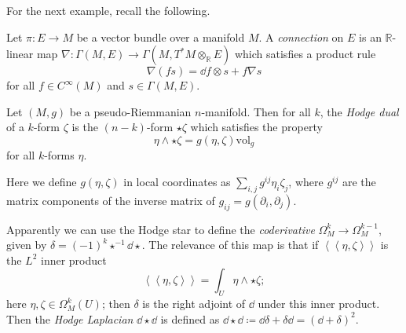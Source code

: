 For the next example, recall the following.

\begin{definition}\label{dfn:4.3.6}
	Let $\pi : E \to M$ be a vector bundle over a manifold $M$. A \emph{connection} on $E$ is an $\mathbb{R} $-linear map $\nabla : \Gamma (M,E) \to \Gamma (M,T^*M\otimes_\mathbb{R} E)$ which satisfies a product rule
	\[
		\nabla (fs) = \dd f\otimes s + f\nabla s
	\]
	for all $f\in C^\infty (M)$ and $s\in\Gamma (M,E)$.
\end{definition}

\begin{definition}\label{dfn:4.3.7}
	Let $(M,g)$ be a pseudo-Riemmanian $n$-manifold. Then for all $k$, the \emph{Hodge dual} of a $k$-form $\zeta $ is the $(n-k)$-form $\star \zeta $ which satisfies the property
	\[
		\eta \wedge \star \zeta =g(\eta ,\zeta )\mathrm{vol} _g
	\]
	for all $k$-forms $\eta$.
\end{definition}
Here we define $g(\eta ,\zeta )$ in local coordinates as $\sum_{i,j} g^{ij} \eta _i\zeta _j$, where $g^{ij} $ are the matrix components of the inverse matrix of $g_{ij} =g(\partial_i,\partial _j)$.

Apparently we can use the Hodge star to define the \emph{coderivative} $\Omega ^k_M \to \Omega ^{k-1} _{M} $, given by $\delta =(-1)^{k} \star ^{-1} \dd \star $. The relevance of this map is that if $\left\langle \left\langle \eta ,\zeta  \right\rangle  \right\rangle  $ is the $L^2$ inner product
\[
	\left\langle \left\langle \eta ,\zeta  \right\rangle  \right\rangle =\int_{U} \eta \wedge \star \zeta 
;\]
here $\eta ,\zeta \in \Omega ^k_M(U)$; then $\delta $ is the right adjoint of $\dd $ under this inner product. Then the \emph{Hodge Laplacian} $\dd \star \dd $ is defined as $\dd \star \dd \coloneqq \dd \delta +\delta \dd  = \left( \dd +\delta  \right) ^2$.



